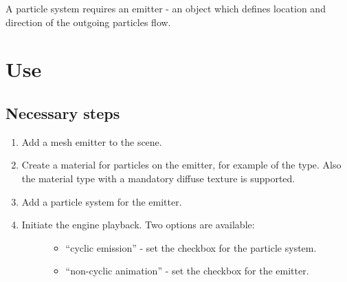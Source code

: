\documentclass[a4paper,12pt,oneside]{sphinxmanual}
\begin{document}
A particle system requires an emitter - an object which defines location and direction of the outgoing particles flow.


\section{Use}
\label{particles:id2}

\subsection{Necessary steps}
\label{particles:id3}\begin{enumerate}
\item {} 
Add a mesh emitter to the scene.

\item {} 
Create a material for particles on the emitter, for example of the  type. Also the  material type with a mandatory diffuse texture is supported.

\item {} 
Add a particle system for the emitter.

\item {} \begin{description}
\item[{Initiate the engine playback. Two options are available:}] \leavevmode\begin{itemize}
\item {} 
``cyclic emission'' - set the  checkbox for the particle system.

\item {} 
``non-cyclic animation'' - set the  checkbox for the emitter.

\end{itemize}

\end{description}

\end{enumerate}
\end{document}
